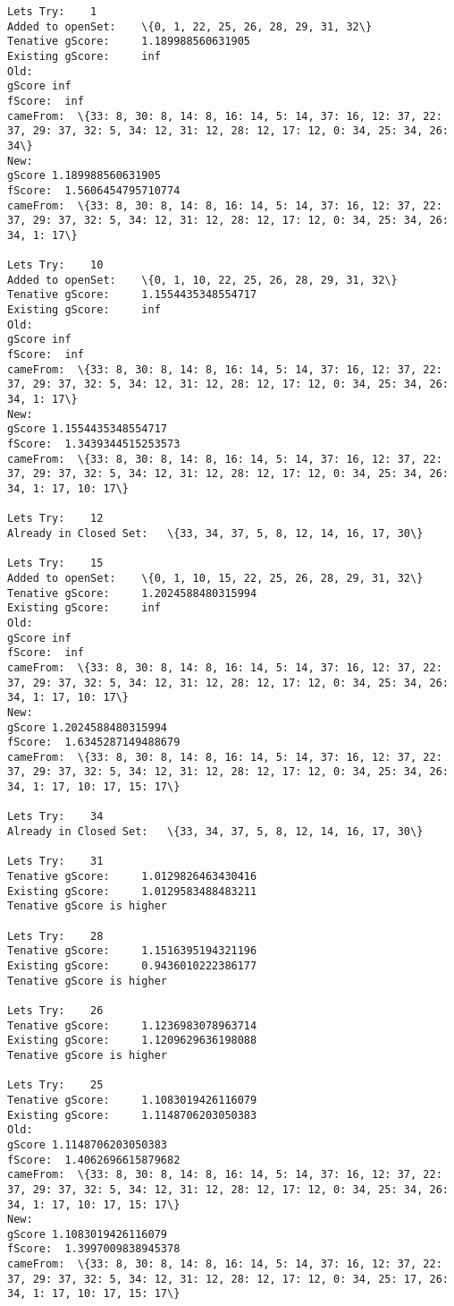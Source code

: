 \documentclass[11pt]{article}
\begin{document}
\begin{Verbatim}[commandchars=\\\{\}]
Lets Try:	 1
Added to openSet:	 \{0, 1, 22, 25, 26, 28, 29, 31, 32\}
Tenative gScore:	 1.189988560631905
Existing gScore:	 inf
Old:
gScore inf
fScore:  inf
cameFrom:  \{33: 8, 30: 8, 14: 8, 16: 14, 5: 14, 37: 16, 12: 37, 22: 37, 29: 37, 32: 5, 34: 12, 31: 12, 28: 12, 17: 12, 0: 34, 25: 34, 26: 34\}
New:
gScore 1.189988560631905
fScore:  1.5606454795710774
cameFrom:  \{33: 8, 30: 8, 14: 8, 16: 14, 5: 14, 37: 16, 12: 37, 22: 37, 29: 37, 32: 5, 34: 12, 31: 12, 28: 12, 17: 12, 0: 34, 25: 34, 26: 34, 1: 17\}

Lets Try:	 10
Added to openSet:	 \{0, 1, 10, 22, 25, 26, 28, 29, 31, 32\}
Tenative gScore:	 1.1554435348554717
Existing gScore:	 inf
Old:
gScore inf
fScore:  inf
cameFrom:  \{33: 8, 30: 8, 14: 8, 16: 14, 5: 14, 37: 16, 12: 37, 22: 37, 29: 37, 32: 5, 34: 12, 31: 12, 28: 12, 17: 12, 0: 34, 25: 34, 26: 34, 1: 17\}
New:
gScore 1.1554435348554717
fScore:  1.3439344515253573
cameFrom:  \{33: 8, 30: 8, 14: 8, 16: 14, 5: 14, 37: 16, 12: 37, 22: 37, 29: 37, 32: 5, 34: 12, 31: 12, 28: 12, 17: 12, 0: 34, 25: 34, 26: 34, 1: 17, 10: 17\}

Lets Try:	 12
Already in Closed Set:	 \{33, 34, 37, 5, 8, 12, 14, 16, 17, 30\}

Lets Try:	 15
Added to openSet:	 \{0, 1, 10, 15, 22, 25, 26, 28, 29, 31, 32\}
Tenative gScore:	 1.2024588480315994
Existing gScore:	 inf
Old:
gScore inf
fScore:  inf
cameFrom:  \{33: 8, 30: 8, 14: 8, 16: 14, 5: 14, 37: 16, 12: 37, 22: 37, 29: 37, 32: 5, 34: 12, 31: 12, 28: 12, 17: 12, 0: 34, 25: 34, 26: 34, 1: 17, 10: 17\}
New:
gScore 1.2024588480315994
fScore:  1.6345287149488679
cameFrom:  \{33: 8, 30: 8, 14: 8, 16: 14, 5: 14, 37: 16, 12: 37, 22: 37, 29: 37, 32: 5, 34: 12, 31: 12, 28: 12, 17: 12, 0: 34, 25: 34, 26: 34, 1: 17, 10: 17, 15: 17\}

Lets Try:	 34
Already in Closed Set:	 \{33, 34, 37, 5, 8, 12, 14, 16, 17, 30\}

Lets Try:	 31
Tenative gScore:	 1.0129826463430416
Existing gScore:	 1.0129583488483211
Tenative gScore is higher

Lets Try:	 28
Tenative gScore:	 1.1516395194321196
Existing gScore:	 0.9436010222386177
Tenative gScore is higher

Lets Try:	 26
Tenative gScore:	 1.1236983078963714
Existing gScore:	 1.1209629636198088
Tenative gScore is higher

Lets Try:	 25
Tenative gScore:	 1.1083019426116079
Existing gScore:	 1.1148706203050383
Old:
gScore 1.1148706203050383
fScore:  1.4062696615879682
cameFrom:  \{33: 8, 30: 8, 14: 8, 16: 14, 5: 14, 37: 16, 12: 37, 22: 37, 29: 37, 32: 5, 34: 12, 31: 12, 28: 12, 17: 12, 0: 34, 25: 34, 26: 34, 1: 17, 10: 17, 15: 17\}
New:
gScore 1.1083019426116079
fScore:  1.3997009838945378
cameFrom:  \{33: 8, 30: 8, 14: 8, 16: 14, 5: 14, 37: 16, 12: 37, 22: 37, 29: 37, 32: 5, 34: 12, 31: 12, 28: 12, 17: 12, 0: 34, 25: 17, 26: 34, 1: 17, 10: 17, 15: 17\}


\end{Verbatim}
\end{document}
